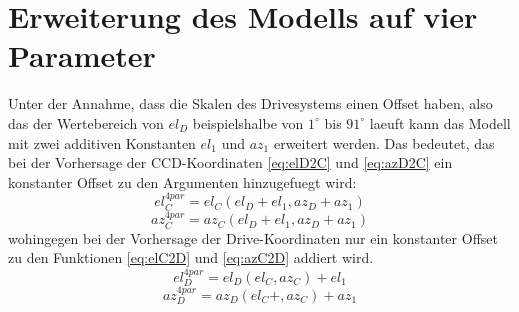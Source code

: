 \section{Erweiterung des Modells auf vier Parameter}
Unter der Annahme, dass die Skalen des Drivesystems einen Offset haben, also das der Wertebereich von $el_D$ beispielshalbe von $1^{\circ}$ bis $91^{\circ}$ laeuft kann das Modell mit zwei additiven Konstanten $el_1$ und $az_1$ erweitert werden. Das bedeutet, das bei der Vorhersage der CCD-Koordinaten \ref{eq:elD2C} und \ref{eq:azD2C} ein konstanter Offset zu den Argumenten hinzugefuegt wird:
\begin{equation}
el_C^{4par}=el_C(el_D+el_1,az_D+az_1)
\label{eq:elD2C4}
\end{equation}
\begin{equation}
az_C^{4par}=az_C(el_D+el_1,az_D+az_1)
\label{eq:azD2C4}
\end{equation}
wohingegen bei der Vorhersage der Drive-Koordinaten nur ein konstanter Offset zu den Funktionen \ref{eq:elC2D} und \ref{eq:azC2D} addiert wird.
\begin{equation}
el_D^{4par}=el_D(el_C,az_C)+el_1
\label{eq:elD2C4}
\end{equation}
\begin{equation}
az_D^{4par}=az_D(el_C+,az_C)+az_1
\label{eq:azD2C4}
\end{equation}
